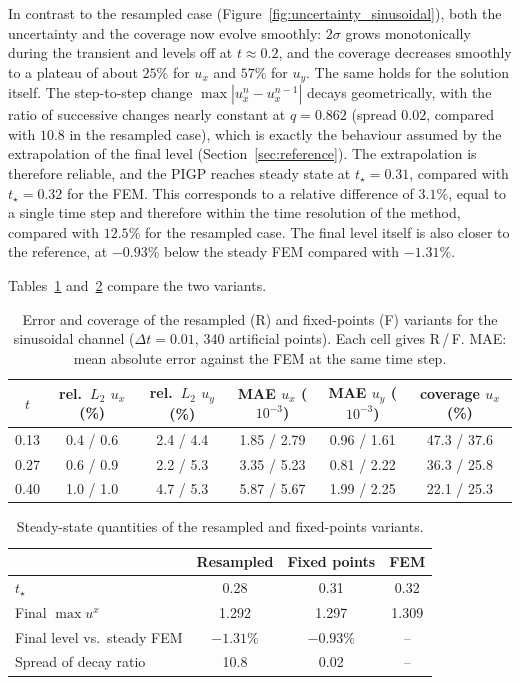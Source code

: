 \documentclass[11pt, a4paper]{report}
\begin{document}
In contrast to the resampled case (Figure~\ref{fig:uncertainty_sinusoidal}), both the
uncertainty and the coverage now evolve smoothly: \(2\sigma\) grows monotonically
during the transient and levels off at \(t \approx 0.2\), and the coverage decreases
smoothly to a plateau of about \(25\%\) for \(u_x\) and \(57\%\) for \(u_y\). The same
holds for the solution itself. The step-to-step change \(\max|u^n_x - u^{n-1}_x|\)
decays geometrically, with the ratio of successive changes nearly constant at
\(q = 0.862\) (spread \(0.02\), compared with \(10.8\) in the resampled case), which is
exactly the behaviour assumed by the extrapolation of the final level
(Section~\ref{sec:reference}). The extrapolation is therefore reliable, and the PIGP
reaches steady state at \(t_\star = 0.31\), compared with \(t_\star = 0.32\) for the
FEM. This corresponds to a relative difference of \(3.1\%\), equal to a single time
step and therefore within the time resolution of the method, compared with \(12.5\%\)
for the resampled case. The final level itself is also closer to the reference, at
\(-0.93\%\) below the steady FEM compared with \(-1.31\%\).

Tables~\ref{tab:fp-vs-resampled-steps} and~\ref{tab:fp-vs-resampled-summary} compare
the two variants.

\begin{table}[H]
\centering
\caption{Error and coverage of the resampled (R) and fixed-points (F) variants for the
sinusoidal channel (\(\Delta t = 0.01\), 340 artificial points). Each cell gives
R\,/\,F. MAE: mean absolute error against the FEM at the same time step.}%
\label{tab:fp-vs-resampled-steps}
\begin{tabular}{cccccc}
\toprule
\(t\) & rel.\ \(L_2\) \(u_x\) (\%) & rel.\ \(L_2\) \(u_y\) (\%) &
MAE \(u_x\) (\(10^{-3}\)) & MAE \(u_y\) (\(10^{-3}\)) & coverage \(u_x\) (\%) \\
\midrule
0.13 & 0.4 / 0.6 & 2.4 / 4.4 & 1.85 / 2.79 & 0.96 / 1.61 & 47.3 / 37.6 \\
0.27 & 0.6 / 0.9 & 2.2 / 5.3 & 3.35 / 5.23 & 0.81 / 2.22 & 36.3 / 25.8 \\
0.40 & 1.0 / 1.0 & 4.7 / 5.3 & 5.87 / 5.67 & 1.99 / 2.25 & 22.1 / 25.3 \\
\bottomrule
\end{tabular}
\end{table}

\begin{table}[H]
\centering
\caption{Steady-state quantities of the resampled and fixed-points variants.}%
\label{tab:fp-vs-resampled-summary}
\begin{tabular}{lccc}
\toprule
 & Resampled & Fixed points & FEM \\
\midrule
\(t_\star\) & 0.28 & 0.31 & 0.32 \\
Final \(\max u^x\) & 1.292 & 1.297 & 1.309 \\
Final level vs.\ steady FEM & \(-1.31\%\) & \(-0.93\%\) & -- \\
Spread of decay ratio & 10.8 & 0.02 & -- \\
\bottomrule
\end{tabular}
\end{table}
\end{document}
